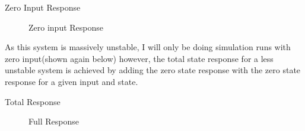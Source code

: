 Zero Input Response
\begin{figure}[H]
  \begin{center}
  \end{center}
  \caption{Zero input Response}
  \label{fig:zero input}
\end{figure}


As this system is massively unstable, I will only be doing simulation runs with zero input(shown again below)
however, the total state response for a less unstable system is achieved by adding the zero state response
with the zero state response for a given input and state.

Total Response
\begin{figure}[H]
  \begin{center}
  \end{center}
  \caption{Full Response}
  \label{fig:full_response}
\end{figure}
